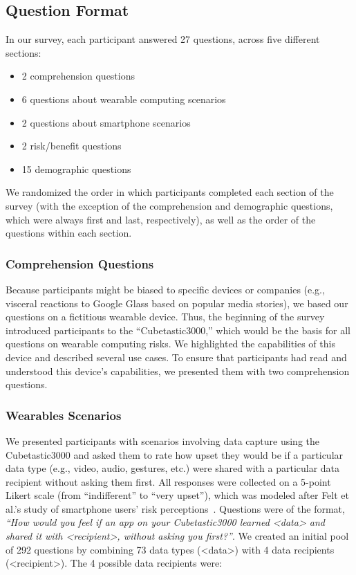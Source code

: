 \documentclass{acm_proc_article-sp}
\begin{document}
\subsection{Question Format}
In our survey, each participant answered 27 questions, across five different sections:   \\[-.8cm]

\begin{itemize} \itemsep1pt \parskip0pt 
\item 2 comprehension questions
\item 6 questions about wearable computing scenarios 
\item 2 questions about smartphone scenarios 
\item 2 risk/benefit questions 
\item 15 demographic questions \\[-.8cm]
\end{itemize}

We randomized the order in which participants completed each section of the survey (with the exception of the comprehension and demographic questions, which were always first and last, respectively), as well as the order of the questions within each section.

\subsubsection{Comprehension Questions}
Because participants might be biased to specific devices or companies (e.g., visceral reactions to Google Glass based on popular media stories), we based our questions on a fictitious wearable device. Thus, the beginning of the survey introduced participants to the ``Cubetastic3000,'' which would be the basis for all questions on wearable computing risks. We highlighted the capabilities of this device and described several use cases. To ensure that participants had read and understood this device's capabilities, we presented them with two comprehension questions.

\subsubsection{Wearables Scenarios}


We presented participants with scenarios involving data capture using the Cubetastic3000 and asked them to rate how upset they would be if a particular data type (e.g., video, audio, gestures, etc.) were shared with a particular data recipient without asking them first. All responses were collected on a 5-point Likert scale (from ``indifferent'' to ``very upset''), which was modeled after Felt et al.'s study of smartphone users' risk perceptions~\cite{Felt}. Questions were of the format, \textit{``How would you feel if an app on your Cubetastic3000 learned <data> and shared it with <recipient>, without asking you first?''}. We created an initial pool of 292 questions by combining 73 data types (<data>) with 4 data recipients (<recipient>). The 4 possible data recipients were:
\end{document}
